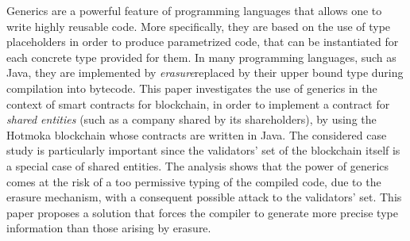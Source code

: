 Generics are a powerful feature of programming languages that allows one
to write highly reusable code.
%
More specifically, they are based on the use of type placeholders in order
to produce parametrized code, that can be instantiated for each
concrete type provided for them. 
%
In many programming languages, such as Java, they are implemented by
\emph{erasure}\ie replaced by their upper bound type during compilation into bytecode.
%
This paper investigates the use of generics in the
context of smart contracts for blockchain, in order to implement
a contract for \emph{shared entities} (such as a company shared
by its shareholders),
by using the Hotmoka blockchain whose contracts are written in Java.
%
The considered case study is particularly important since
the validators' set of the blockchain itself is
a special case of shared entities.
The analysis shows that the power of generics comes at the risk of a too permissive
typing of the compiled code, due to the erasure mechanism, with a consequent possible attack
to the validators' set. This paper proposes a solution
that forces the compiler to generate more precise type information than
those arising by erasure.
